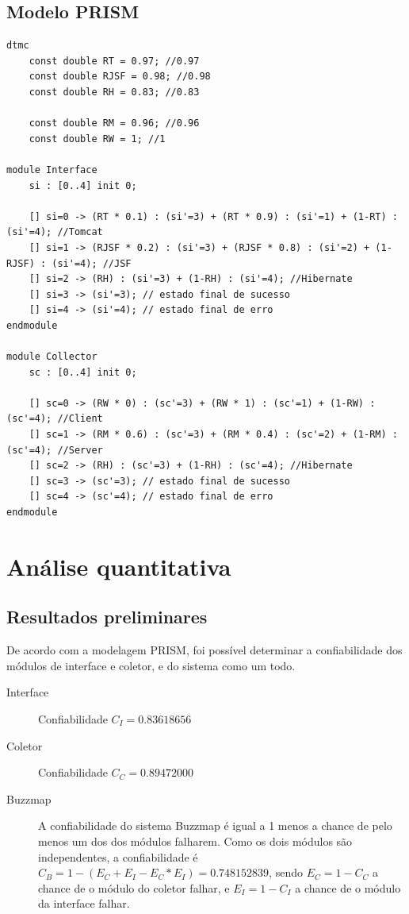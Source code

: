 \subsection{Modelo PRISM}
\label{sec:prism}
\begin{verbatim}
dtmc
	const double RT = 0.97; //0.97
	const double RJSF = 0.98; //0.98
	const double RH = 0.83; //0.83

	const double RM = 0.96; //0.96
	const double RW = 1; //1

module Interface
	si : [0..4] init 0;
	
	[] si=0 -> (RT * 0.1) : (si'=3) + (RT * 0.9) : (si'=1) + (1-RT) : (si'=4); //Tomcat
	[] si=1 -> (RJSF * 0.2) : (si'=3) + (RJSF * 0.8) : (si'=2) + (1-RJSF) : (si'=4); //JSF
	[] si=2 -> (RH) : (si'=3) + (1-RH) : (si'=4); //Hibernate
	[] si=3 -> (si'=3); // estado final de sucesso
	[] si=4 -> (si'=4); // estado final de erro
endmodule

module Collector
	sc : [0..4] init 0;
	
	[] sc=0 -> (RW * 0) : (sc'=3) + (RW * 1) : (sc'=1) + (1-RW) : (sc'=4); //Client
	[] sc=1 -> (RM * 0.6) : (sc'=3) + (RM * 0.4) : (sc'=2) + (1-RM) : (sc'=4); //Server
	[] sc=2 -> (RH) : (sc'=3) + (1-RH) : (sc'=4); //Hibernate
	[] sc=3 -> (sc'=3); // estado final de sucesso
	[] sc=4 -> (sc'=4); // estado final de erro
endmodule
\end{verbatim}

\section{Análise quantitativa}
\subsection{Resultados preliminares}
De acordo com a modelagem PRISM, foi possível determinar a
confiabilidade dos módulos de interface e coletor, e do sistema como
um todo.
\begin{description}
\item[Interface] Confiabilidade $C_I = 0.83618656$
\item[Coletor] Confiabilidade $C_C = 0.89472000$
\item[Buzzmap] A confiabilidade do sistema Buzzmap é igual a 1 menos a
chance de pelo menos um dos dos módulos falharem. Como os dois módulos
são independentes, a confiabilidade é $C_B = 1 - (E_C+E_I-E_C*E_I) = 0.748152839$,
    sendo $E_C = 1 - C_C$ a chance de o módulo do coletor falhar, e
    $E_I = 1 - C_I$ a chance de o módulo da interface falhar.
\end{description}

